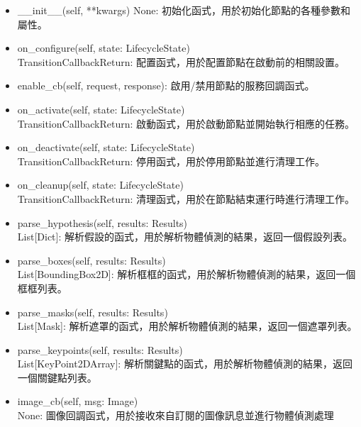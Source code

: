 \begin{itemize}
    \item \_\_init\_\_(self, **kwargs) 
        None: 初始化函式，用於初始化節點的各種參數和屬性。
    \item on\_configure(self, state: LifecycleState) \\
        TransitionCallbackReturn: 配置函式，用於配置節點在啟動前的相關設置。
    \item enable\_cb(self, request, response): 啟用/禁用節點的服務回調函式。
    \item on\_activate(self, state: LifecycleState) \\
        TransitionCallbackReturn: 啟動函式，用於啟動節點並開始執行相應的任務。
    \item on\_deactivate(self, state: LifecycleState) \\
        TransitionCallbackReturn: 停用函式，用於停用節點並進行清理工作。
    \item on\_cleanup(self, state: LifecycleState) \\
        TransitionCallbackReturn: 清理函式，用於在節點結束運行時進行清理工作。
    \item parse\_hypothesis(self, results: Results) \\
        List[Dict]: 解析假設的函式，用於解析物體偵測的結果，返回一個假設列表。
    \item parse\_boxes(self, results: Results)\\
         List[BoundingBox2D]: 解析框框的函式，用於解析物體偵測的結果，返回一個框框列表。
    \item parse\_masks(self, results: Results) \\
        List[Mask]: 解析遮罩的函式，用於解析物體偵測的結果，返回一個遮罩列表。
    \item parse\_keypoints(self, results: Results) \\
        List[KeyPoint2DArray]: 解析關鍵點的函式，用於解析物體偵測的結果，返回一個關鍵點列表。
    \item image\_cb(self, msg: Image) \\
        None: 圖像回調函式，用於接收來自訂閱的圖像訊息並進行物體偵測處理
\end{itemize}


